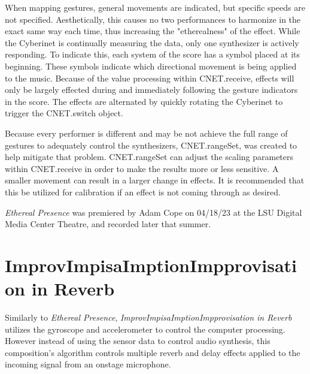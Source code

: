 When mapping gestures, general movements are indicated, but specific speeds are not specified. Aesthetically, this causes no two performances to harmonize in the exact same way each time, thus increasing the "etherealness" of the effect. While the Cyberinet is continually measuring the data, only one synthesizer is actively responding. To indicate this, each system of the score has a symbol placed at its beginning. These symbols indicate which directional movement is being applied to the music. Because of the value processing within CNET.receive, effects will only be largely effected during and immediately following the gesture indicators in the score. The effects are alternated by quickly rotating the Cyberinet to trigger the CNET.switch object.


Because every performer is different and may be not achieve the full range of gestures to adequately control the synthesizers, CNET.rangeSet, was created to help mitigate that problem. CNET.rangeSet can adjust the scaling parameters within CNET.receive in order to make the results more or less sensitive. A smaller movement can result in a larger change in effects. It is recommended that this be utilized for calibration if an effect is not coming through as desired.

\textit{Ethereal Presence} was premiered by Adam Cope on 04/18/23 at the LSU Digital Media Center Theatre, and recorded later that summer.


\section{ImprovImpisaImptionImpprovisation in Reverb}
Similarly to \textit{Ethereal Presence}, \textit{ImprovImpisaImptionImpprovisation in Reverb} utilizes the gyroscope and accelerometer to control the computer processing. However instead of using the sensor data to control audio synthesis, this composition's algorithm controls multiple reverb and delay effects applied to the incoming signal from an onstage microphone.

